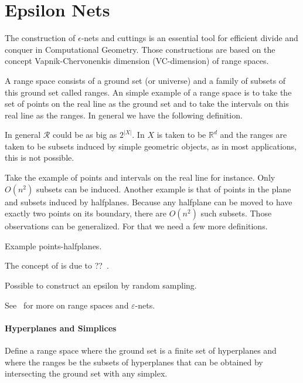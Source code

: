 \section{Epsilon Nets}%
\label{sec:divide-and-conquer:epsilon-nets}

The construction of \(\epsilon\)-nets and cuttings
is an essential tool for efficient divide and conquer
in Computational Geometry.
%
Those constructions are based on the concept Vapnik-Chervonenkis dimension
(VC-dimension) of range spaces.

A range space consists of a ground set (or universe) and a family of
subsets of this ground set called ranges.
%
An simple example of a range space is to take the set of points on the real
line as the ground set and to take the intervals on this real line as the
ranges.
%
In general we have the following definition.
%


In general \(\mathcal{R}\) could be as big as \(2^{| X |}\).
In \(X\) is taken to be \(\mathbb{R}^d\) and the ranges are taken to be subsets
induced by simple geometric objects, as in most applications, this is not possible.

Take the example of points and intervals on the real line for instance. Only
\(O(n^2)\) subsets can be induced. Another example is that of points in the
plane and subsets induced by halfplanes. Because any halfplane can be moved to
have exactly two points on its boundary, there are \(O(n^2)\) such subsets.
%
Those observations can be generalized. For that we need a few more definitions.



Example points-halfplanes.






The concept of \enets{} is due to ??~\cite{???}.
%


Possible to construct an epsilon by random sampling.



See~\cite[Section~40.4]{CMR04} for more on
range spaces and \(\varepsilon\)-nets.

\paragraph{Hyperplanes and Simplices}

Define a range space where the ground set is a finite set of hyperplanes and
where the ranges be the subsets of hyperplanes that can be obtained by
intersecting the ground set with any simplex.

